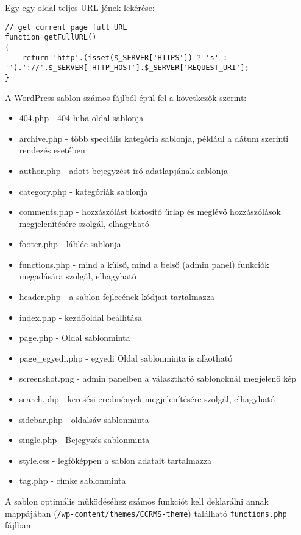 \newpage

Egy-egy oldal teljes URL-jének lekérése:

\begin{lstlisting}
// get current page full URL
function getFullURL()
{
	return 'http'.(isset($_SERVER['HTTPS']) ? 's' : '').'://'.$_SERVER['HTTP_HOST'].$_SERVER['REQUEST_URI'];
}
\end{lstlisting}

\newpage


A WordPress sablon számos fájlból épül fel a következők szerint:

\begin{itemize}
	\item 404.php - 404 hiba oldal sablonja
	\item archive.php - több speciális kategória sablonja, például a dátum szerinti rendezés esetében
	\item author.php - adott bejegyzést író adatlapjának sablonja
	\item category.php - kategóriák sablonja
	\item comments.php - hozzászólást biztosító űrlap és meglévő hozzászólások megjelenítésére szolgál, elhagyható
	\item footer.php - lábléc sablonja
	\item functions.php - mind a külső, mind a belső (admin panel) funkciók megadására szolgál, elhagyható
	\item header.php - a sablon fejlecének kódjait tartalmazza
	\item index.php - kezdőoldal beállítása
	\item page.php - Oldal sablonminta
	\item page\_egyedi.php - egyedi Oldal sablonminta is alkotható
	\item screenshot.png - admin panelben a választható sablonoknál megjelenő kép
	\item search.php - keresési eredmények megjelenítésére szolgál, elhagyható
	\item sidebar.php - oldalsáv sablonminta
	\item single.php - Bejegyzés sablonminta
	\item style.css - legfőképpen a sablon adatait tartalmazza
	\item tag.php - címke sablonminta
\end{itemize}

A sablon optimális működéséhez számos funkciót kell deklarálni annak mappájában (\texttt{/wp-content/themes/CCRMS-theme}) található \texttt{functions.php} fájlban.

